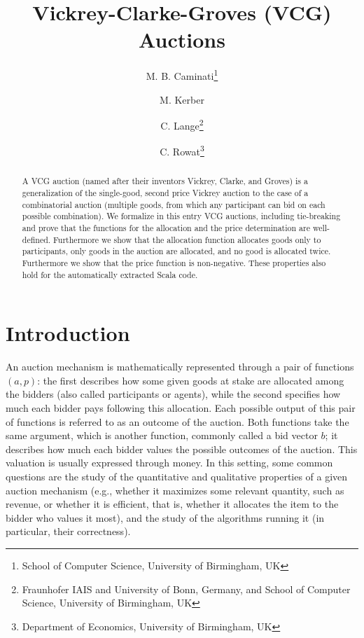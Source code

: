 \documentclass[11pt,a4paper]{article}
\begin{document}
\title{Vickrey-Clarke-Groves (VCG) Auctions}
\author{M. B. Caminati\footnote{School of Computer Science, University of Birmingham, UK}\addtocounter{footnote}{-1}
  \and M. Kerber\footnotemark
  \and C. Lange\footnote{Fraunhofer IAIS and University of Bonn, Germany, and School of Computer Science, University of Birmingham, UK}
  \and C. Rowat\footnote{Department of Economics, University of Birmingham, UK}}
\maketitle

\begin{abstract}
A VCG auction (named after their inventors Vickrey, Clarke, and
Groves) is a generalization of the single-good, second price Vickrey
auction to the case of a combinatorial auction (multiple goods, from
which any participant can bid on each possible combination). We
formalize in this entry VCG auctions, including tie-breaking and prove
that the functions for the allocation and the price determination are
well-defined. Furthermore we show that the allocation function
allocates goods only to participants, only goods in the auction are
allocated, and no good is allocated twice. Furthermore we show that
the price function is non-negative. These properties also hold for the
automatically extracted Scala code.
\end{abstract}




\tableofcontents

\section{Introduction}
An auction mechanism is mathematically represented through a pair of
functions $(a, p)$: the first describes how some given goods at stake
are allocated among the bidders (also called participants or agents),
while the second specifies how much each bidder pays following this
allocation.  Each possible output of this pair of functions is
referred to as an outcome of the auction. Both functions take the same
argument, which is another function, commonly called a bid vector $b$;
it describes how much each bidder values the possible outcomes of the
auction. This valuation is usually expressed through money.  In this
setting, some common questions are the study of the quantitative and
qualitative properties of a given auction mechanism (e.g., whether it
maximizes some relevant quantity, such as revenue, or whether it is
efficient, that is, whether it allocates the item to the bidder who
values it most), and the study of the algorithms running it (in
particular, their correctness).
\end{document}
